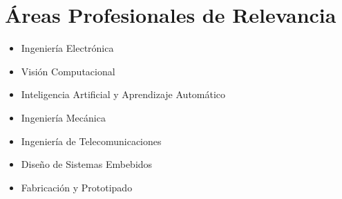\section{Áreas Profesionales de Relevancia}
\label{Áreas Profesionales de Relevancia}

\begin{itemize}
    \item Ingeniería Electrónica
    \item Visión Computacional
    \item Inteligencia Artificial y Aprendizaje Automático
    \item Ingeniería Mecánica
    \item Ingeniería de Telecomunicaciones
    \item Diseño de Sistemas Embebidos
    \item Fabricación y Prototipado
\end{itemize}